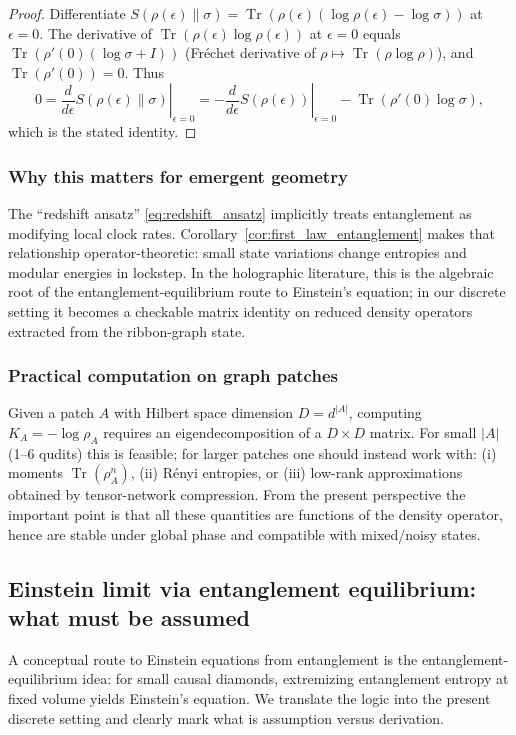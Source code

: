 \documentclass[11pt,oneside]{amsbook}
\numberwithin{equation}{section}
\theoremstyle{plain}
\theoremstyle{definition}
\theoremstyle{remark}
\DeclareMathOperator{\Tr}{\mathrm{Tr}}
\begin{document}
\begin{proof}
Differentiate $S(\rho(\epsilon)\|\sigma)=\Tr(\rho(\epsilon)(\log\rho(\epsilon)-\log\sigma))$ at $\epsilon=0$.
The derivative of $\Tr(\rho(\epsilon)\log\rho(\epsilon))$ at $\epsilon=0$ equals $\Tr(\rho'(0)(\log\sigma+I))$ (Fr\'echet derivative of $\rho\mapsto \Tr(\rho\log\rho)$), and $\Tr(\rho'(0))=0$.
Thus
\[
0=\left.\frac{d}{d\epsilon}S(\rho(\epsilon)\|\sigma)\right|_{\epsilon=0}
= -\left.\frac{d}{d\epsilon}S(\rho(\epsilon))\right|_{\epsilon=0}
-\Tr(\rho'(0)\log\sigma),
\]
which is the stated identity.
\end{proof}

\subsubsection{Why this matters for emergent geometry}
The ``redshift ansatz'' \eqref{eq:redshift_ansatz} implicitly treats entanglement as modifying local clock rates.
Corollary~\ref{cor:first_law_entanglement} makes that relationship operator-theoretic: small state variations change entropies and modular energies in lockstep.
In the holographic literature, this is the algebraic root of the entanglement-equilibrium route to Einstein's equation; in our discrete setting it becomes a checkable matrix identity on reduced density operators extracted from the ribbon-graph state.

\subsubsection{Practical computation on graph patches}
Given a patch $A$ with Hilbert space dimension $D=d^{|A|}$, computing $K_A=-\log\rho_A$ requires an eigendecomposition of a $D\times D$ matrix.
For small $|A|$ (1--6 qudits) this is feasible; for larger patches one should instead work with:
(i) moments $\Tr(\rho_A^n)$, (ii) R\'enyi entropies, or (iii) low-rank approximations obtained by tensor-network compression.
From the present perspective the important point is that all these quantities are functions of the density operator, hence are stable under global phase and compatible with mixed/noisy states.

\subsection{Einstein limit via entanglement equilibrium: what must be assumed}
\label{sec:einstein_limit}

A conceptual route to Einstein equations from entanglement is the entanglement-equilibrium idea:
for small causal diamonds, extremizing entanglement entropy at fixed volume yields Einstein's equation.
We translate the logic into the present discrete setting and clearly mark what is assumption versus derivation.
\end{document}
